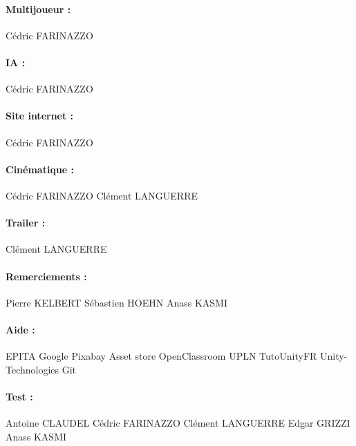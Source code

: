 \documentclass[titlepage, 13px, a4paper]{report}
\begin{document}
\paragraph*{Multijoueur : } \hspace{0pt}
Cédric FARINAZZO \\

\paragraph*{IA : } \hspace{0pt}
Cédric FARINAZZO \\

\paragraph*{Site internet : } \hspace{0pt}
Cédric FARINAZZO \\

\paragraph*{Cinématique : } \hspace{0pt}
Cédric FARINAZZO
Clément LANGUERRE \\

\paragraph*{Trailer : } \hspace{0pt}
Clément LANGUERRE \\

\paragraph*{Remerciements : } \hspace{0pt}
Pierre KELBERT
Sébastien HOEHN
Anass KASMI \\

\paragraph*{Aide : } \hspace{0pt}
EPITA
Google
Pixabay
Asset store
OpenClassroom
UPLN
TutoUnityFR
Unity-Technologies
Git \\

\paragraph*{Test : } \hspace{0pt}
Antoine CLAUDEL
Cédric FARINAZZO
Clément LANGUERRE
Edgar GRIZZI
Anass KASMI \\
\end{document}
